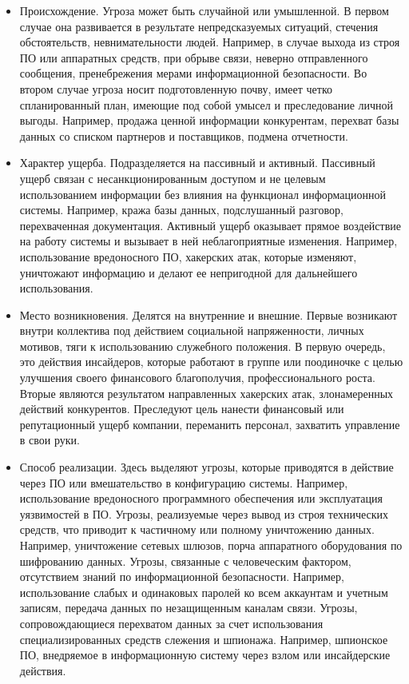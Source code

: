 \begin{itemize} 

	\item Происхождение. Угроза может быть случайной или умышленной. В первом случае она развивается в результате непредсказуемых ситуаций, стечения обстоятельств, невнимательности людей. Например, в случае выхода из строя ПО или аппаратных средств, при обрыве связи, неверно отправленного сообщения, пренебрежения мерами информационной безопасности. Во втором случае угроза носит подготовленную почву, имеет четко спланированный план, имеющие под собой умысел и преследование личной выгоды. Например, продажа ценной информации конкурентам, перехват базы данных со списком партнеров и поставщиков, подмена отчетности.

	\item Характер ущерба. Подразделяется на пассивный и активный. Пассивный ущерб связан с несанкционированным доступом и не целевым использованием информации без влияния на функционал информационной системы. Например, кража базы данных, подслушанный разговор, перехваченная документация. Активный ущерб оказывает прямое воздействие на работу системы и вызывает в ней неблагоприятные изменения. Например, использование вредоносного ПО, хакерских атак, которые изменяют, уничтожают информацию и делают ее непригодной для дальнейшего использования.

	\item Место возникновения. Делятся на внутренние и внешние. Первые возникают внутри коллектива под действием социальной напряженности, личных мотивов, тяги к использованию служебного положения. В первую очередь, это действия инсайдеров, которые работают в группе или поодиночке с целью улучшения своего финансового благополучия, профессионального роста. Вторые являются результатом направленных хакерских атак, злонамеренных действий конкурентов. Преследуют цель нанести финансовый или репутационный ущерб компании, переманить персонал, захватить управление в свои руки.

	\item Способ реализации. Здесь выделяют угрозы, которые приводятся в действие через ПО или вмешательство в конфигурацию системы. Например, использование вредоносного программного обеспечения или эксплуатация уязвимостей в ПО. Угрозы, реализуемые через вывод из строя технических средств, что приводит к частичному или полному уничтожению данных. Например, уничтожение сетевых шлюзов, порча аппаратного оборудования по шифрованию данных. Угрозы, связанные с человеческим фактором, отсутствием знаний по информационной безопасности. Например, использование слабых и одинаковых паролей ко всем аккаунтам и учетным записям, передача данных по незащищенным каналам связи. Угрозы, сопровождающиеся перехватом данных за счет использования специализированных средств слежения и шпионажа. Например, шпионское ПО, внедряемое в информационную систему через взлом или инсайдерские действия.

\end{itemize}

